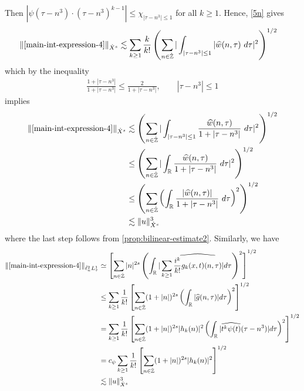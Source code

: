 \documentclass[12pt,reqno]{amsart}
\numberwithin{equation}{section}  %
\numberwithin{figure}{section}
\newcommand{\rr}{\mathbb{R}}
\newcommand{\zz}{\mathbb{Z}}
\newcommand{\zzdot}{\dot{\zz}}
\newcommand{\wh}{\widehat}
\theoremstyle{plain}
\theoremstyle{definition}
\theoremstyle{remark}
\begin{document}
Then $| \psi\left( \tau - n^3 \right) \cdot \left( \tau - n^3 \right)^{k 
-1} | \le \chi_{| \tau - n^3 | \le 1}$ for all $k \ge 1$. Hence, \eqref{5n} gives
%
\begin{equation*}
	\begin{split}
		\|\eqref{main-int-expression-4} \|_{\dot{X}^s} 
		& \lesssim \sum_{k \ge 1} \frac{k}{k!}  \left( \sum_{n \in \zzdot} | 
		\int_{| \tau - n^{3}  |\le 1} | \wh{w}(n, \tau) \ d \tau |^2 
		\right)^{1/2}
	\end{split}
\end{equation*}
%
which by the inequality
%
\begin{equation*}
	\begin{split}
		\frac{1 + | \tau - n^3 |}{1 + | \tau  - n^3 |} \le 
		\frac{2}{1 + | \tau - n^3 |}, \qquad | \tau - n^3  | \le 1
	\end{split}
\end{equation*}
%
implies
%
\begin{equation}
\label{main-int4-est-X-s-part}
	\begin{split}
		\|\eqref{main-int-expression-4}\|_{\dot{X}^s}
		& \lesssim \left( \sum_{n \in \zzdot} | \int_{| \tau - n^{3}| \le 1 }
		\frac{\wh{w}(n, \tau)}{1 + | \tau - n^3 |} \ d \tau |^2 
		\right)^{1/2}
		\\
		& \le \left( \sum_{n \in \zzdot} | \int_\rr
		\frac{\wh{w}(n, \tau)}{1 + | \tau - n^3 |} \ d \tau |^2 
		\right)^{1/2} \\
		& \le \left( \sum_{n \in \zzdot} \left( \int_\rr 
		\frac{|\wh{w}(n, \tau)|}{1 + | \tau - n^3 |}  \ d \tau  \right)^2
		\right)^{1/2} \\
		& \lesssim \|u\|_{\dot{X}^s}^3
	\end{split}
\end{equation}
%
where the last step follows from \autoref{prop:bilinear-estimate2}. Similarly,
we have
%
%
\begin{equation}
\label{main-int4-est-Y-s-part}
	\begin{split}
		\|\eqref{main-int-expression-4}\|_{\dot{\ell}^2_n L^1_\tau}
		& \simeq \left[ \sum_{n \in
		\zzdot}|n|^{2s} \left( \int_{\rr} | \sum_{k \ge 1}
		\wh{\frac{i^{k}}{k!}g_{k}(x,t)(n, \tau)} |d \tau \right)^{2} \right]^{1/2}
		\\
		& \le \sum_{k \ge 1} \frac{1}{k!} \left[ \sum_{n \in \zzdot} (1 + | n
		|)^{2s} \left( \int_{\rr} | \wh{g}(n, \tau) | d \tau \right)^{2}
		\right]^{1/2}
		\\
		& = \sum_{k \ge 1} \frac{1}{k!} \left[ \sum_{n \in \zzdot} (1 + | n
		|)^{2s} | h_{k}(n) |^2 \left( \int_{\rr} | \wh{t^{k} \psi(t)}(\tau -
		n^{3}) |d \tau \right)^{2} \right]^{1/2}
		\\
		& = c_{\psi} \sum_{k \ge 1} \frac{1}{k!} \left[ \sum_{n \in \zzdot} (1 + | n
		|)^{2s} | h_{k}(n) |^2 \right]^{1/2}
		\\
		& \lesssim \|u\|_{\dot{X}^s}^{3}
	\end{split}
\end{equation}
\end{document}
